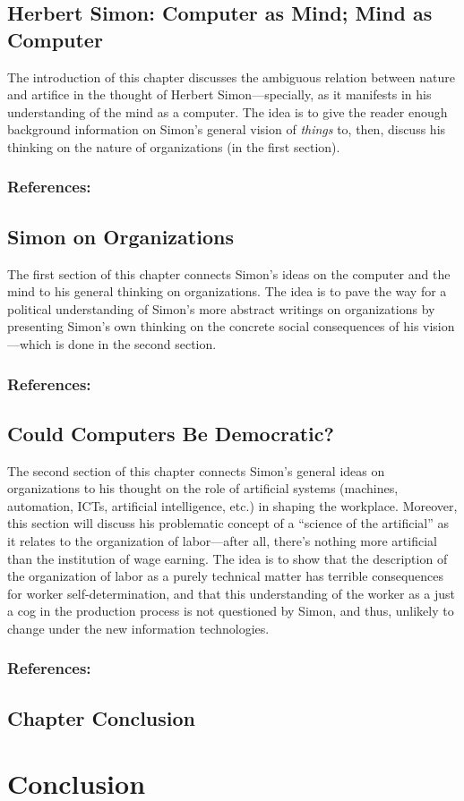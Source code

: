 \documentclass[version=last,draft=false,paper=A4,portrait,twoside=true,twocolumn=true,headinclude=false,footinclude=false,fontsize=12,BCOR=20mm,DIV=13,pagesize=auto,titlepage=false,mpinclude=false,open=right,chapterprefix=true,numbers=autoendperiod,headsepline=false,parskip=false]{scrbook}
\begin{document}
\section{Herbert Simon: Computer as Mind; Mind as Computer}
\label{sec:orge4cbc35}
The introduction of this chapter discusses the ambiguous relation between
nature and artifice in the thought of Herbert Simon---specially, as it
manifests in his understanding of the mind as a computer. The idea is to
give the reader enough background information on Simon's general vision of
\emph{things} to, then, discuss his thinking on the nature of organizations (in
the first section).

\subsection*{References:}
\printbibliography[heading=none,keyword=chapter-2]
\section{Simon on Organizations}
\label{sec:org875cff7}
The first section of this chapter connects Simon's ideas on the computer
and the mind to his general thinking on organizations. The idea is to pave
the way for a political understanding of Simon's more abstract writings on
organizations by presenting Simon's own thinking on the concrete social
consequences of his vision---which is done in the second section.

\subsection*{References:}
\printbibliography[heading=none,keyword=chapter-2.1]
\section{Could Computers Be Democratic?}
\label{sec:org8ed4785}
The second section of this chapter connects Simon's general ideas on
organizations to his thought on the role of artificial systems (machines,
automation, ICTs, artificial intelligence, etc.) in shaping the workplace.
Moreover, this section will discuss his problematic concept of a ``science
of the artificial'' as it relates to the organization of labor---after all,
there's nothing more artificial than the institution of wage earning. The
idea is to show that the description of the organization of labor as a
purely technical matter has terrible consequences for worker
self-determination, and that this understanding of the worker as a just a
cog in the production process is not questioned by Simon, and thus,
unlikely to change under the new information technologies.

\subsection*{References:}
\printbibliography[heading=none,keyword=chapter-2.2]
\section{Chapter Conclusion}
\label{sec:orgeab0b8e}
\printbibliography[heading=none,keyword=chapter-2.3]
\chapter{Conclusion}
\label{sec:org6e2cd91}
\end{document}
